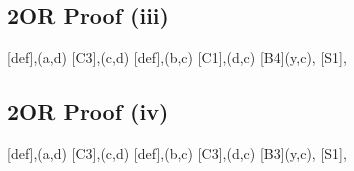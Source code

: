 \subsection{2OR Proof (iii)}
\label{sub:2OR Proof (iii)}
\begin{prooftree*}[downwards]
  [def]{,\poe(a,d)}
  [C3]{,\poe(c,d)}
  [def]{,\poo(b,c)}
  [C1]{,\pee(d,c)}
  [B4]{\pee(y,c),}
  [S1]{,}
\end{prooftree*}
\subsection{2OR Proof (iv)}
\label{sub:2OR Proof (iv)}
\begin{prooftree*}[downwards]
  [def]{,\poo(a,d)}
  [C3]{,\poo(c,d)}
  [def]{,\poo(b,c)}
  [C3]{,\poo(d,c)}
  [B3]{\pee(y,c),}
  [S1]{,}
\end{prooftree*}
